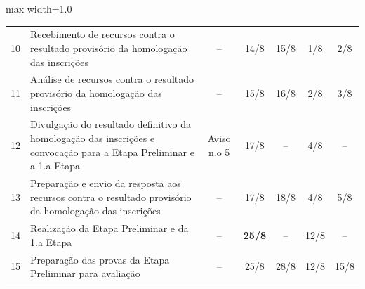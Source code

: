 \begin{quadro}[htb]
\begin{adjustbox}{max width=1.0\linewidth}
\begin{tabular}{|c|l|c|c|c|c|c|}
10 & Recebimento de   recursos contra o resultado provisório da homologação das inscrições                                                      & –                   & 14/8                                                                            & 15/8                                  & 1/8                                                                             & 2/8                  \\
\rowcolor[HTML]{FCD5B4} 
11 & Análise de recursos   contra o resultado provisório da homologação das inscrições                                                          & –                   & 15/8                                                                            & 16/8                                  & 2/8                                                                             & 3/8                  \\
\rowcolor[HTML]{92CDDC} 
12 & Divulgação do   resultado definitivo da homologação das inscrições e convocação para a Etapa   Preliminar e a 1.a Etapa                    & Aviso n.o 5         & 17/8                                                                            & –                                     & 4/8                                                                             & –                    \\
13 & Preparação e envio da   resposta aos recursos contra o resultado provisório da homologação das   inscrições                                & –                   & 17/8                                                                            & 18/8                                  & 4/8                                                                             & 5/8                  \\
\rowcolor[HTML]{92D050} 
14 & Realização da Etapa   Preliminar e da 1.a Etapa                                                                                            & –                   & {\color[HTML]{FF0000} \textbf{25/8}}                                            & –                                     & 12/8                                                                            & –                    \\
15 & Preparação das provas   da Etapa Preliminar para avaliação                                                                                 & –                   & 25/8                                                                            & 28/8                                  & 12/8                                                                            & 15/8                 \\

\end{tabular}
\end{adjustbox}
\end{quadro}
